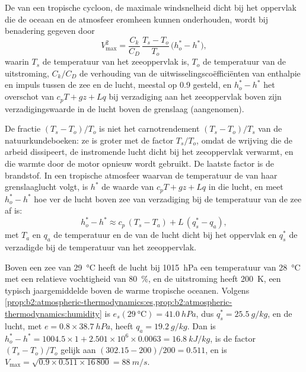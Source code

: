 \begin{proposition}\label{prop:b2:weather-systems:pi}
De \emph{} van een tropische cycloon, de maximale windsnelheid dicht bij het oppervlak die
de oceaan en de atmosfeer eromheen kunnen onderhouden, wordt bij benadering gegeven door
\[
  V_{\max}^2 = \frac{C_k}{C_D}\,\frac{T_s - T_o}{T_o}\,\bigl(h_o^* - h^*\bigr),
\]
waarin $T_s$ de temperatuur van het zeeoppervlak is, $T_o$ de temperatuur van de uitstroming, $C_k/C_D$
de verhouding van de uitwisselingscoëfficiënten van enthalpie en impuls tussen de zee en de lucht,
meestal op 0.9 gesteld, en $h_o^* - h^*$ het overschot van $c_pT + gz + Lq$ bij verzadiging aan het
zeeoppervlak boven zijn verzadigingswaarde in de lucht boven de grenslaag (aangenomen).
\end{proposition}

De fractie $(T_s - T_o)/T_o$ is niet het carnotrendement $(T_s - T_o)/T_s$ van de
natuurkundeboeken: ze is groter met de factor $T_s/T_o$, omdat de wrijving die de arbeid dissipeert, de
instromende lucht dicht bij het zeeoppervlak verwarmt, en die warmte door de motor opnieuw wordt gebruikt. De laatste
factor is de brandstof. In een tropische atmosfeer waarvan de temperatuur de  van haar
grenslaaglucht volgt, is $h^*$ de waarde van $c_pT + gz + Lq$ in die lucht, en meet $h_o^* - h^*$
hoe ver de lucht boven zee van verzadiging bij de temperatuur van de zee af is:
\[
  h_o^* - h^* \approx c_p\,(T_s - T_a) + L\,(q_s^* - q_a),
\]
met $T_a$ en $q_a$ de temperatuur en de  van de lucht dicht bij het oppervlak en
$q_s^*$ de verzadigde  bij de temperatuur van het zeeoppervlak.

\begin{example}\label{ex:b2:weather-systems:pi}
Boven een zee van \qty{29}{\celsius} heeft de lucht bij \qty{1015}{hPa} een temperatuur van \qty{28}{\celsius} met een
relatieve vochtigheid van \qty{80}{\percent}, en de uitstroming heeft \qty{200}{K}, een typisch
jaargemiddelde boven de warme tropische oceanen. Volgens \cref{prop:b2:atmospheric-thermodynamics:es,prop:b2:atmospheric-thermodynamics:humidity}
is $e_s(\qty{29}{\celsius}) = \qty{41.0}{hPa}$, dus $q_s^* = \qty{25.5}{g/kg}$, en de lucht, met
$e = 0.8 \times \qty{38.7}{hPa}$, heeft $q_a = \qty{19.2}{g/kg}$. Dan is $h_o^* - h^* = 1004.5 \times
1 + 2.501 \times 10^6 \times 0.0063 = \qty{16.8}{kJ/kg}$, is de factor $(T_s - T_o)/T_o$ gelijk aan
$(302.15 - 200)/200 = 0.511$, en is $V_{\max} = \sqrt{0.9 \times 0.511 \times 16\,800} =
\qty{88}{m/s}$.
\end{example}

